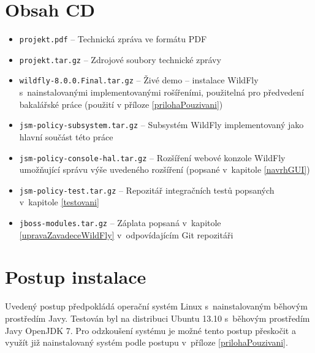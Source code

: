 \chapter{Obsah CD}

\begin{itemize}
  \item {\tt projekt.pdf} -- Technická zpráva ve formátu PDF
  \item {\tt projekt.tar.gz} -- Zdrojové soubory technické zprávy

  \item {\tt wildfly-8.0.0.Final.tar.gz} -- Živé demo -- instalace WildFly s~nainstalovanými implementovanými rošířeními, použitelná pro předvedení bakalářské práce (použití v příloze \ref{prilohaPouzivani})

  \item {\tt jsm-policy-subsystem.tar.gz} -- Subsystém WildFly implementovaný jako hlavní součást této práce
  \item {\tt jsm-policy-console-hal.tar.gz} -- Rozšíření webové konzole WildFly umožňující správu výše uvedeného rozšíření (popsané v~kapitole \ref{navrhGUI})
  \item {\tt jsm-policy-test.tar.gz} -- Repozitář integračních testů popsaných v~kapitole \ref{testovani}

  \item {\tt jboss-modules.tar.gz} -- Záplata popsaná v~kapitole \ref{upravaZavadeceWildFly} v~odpovídajícím Git repozitáři
\end{itemize}


\chapter{Postup instalace}\label{prilohaInstalace}

Uvedený postup předpokládá operační systém Linux s~nainstalovaným běhovým prostředím Javy. Testován byl na distribuci Ubuntu 13.10 s~běhovým prostředím Javy OpenJDK 7. Pro odzkoušení systému je možné tento postup přeskočit a využít již nainstalovaný systém podle postupu v~příloze \ref{prilohaPouzivani}.

